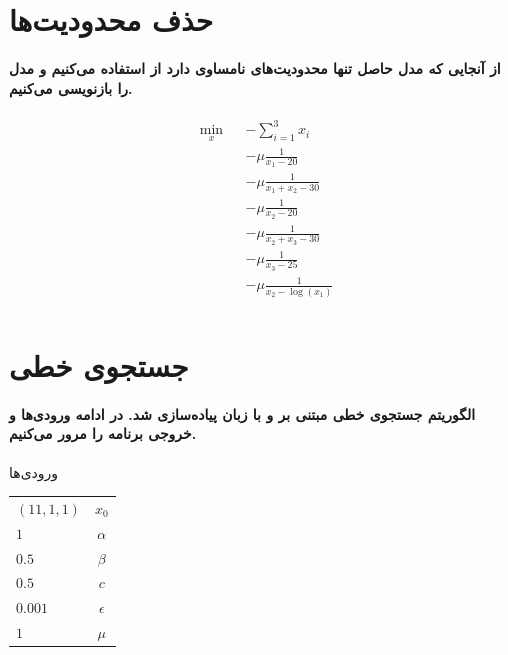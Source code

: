 \documentclass[paper=a4, fontsize=11pt]{article}
\numberwithin{equation}{section} %
\numberwithin{figure}{section} %
\numberwithin{table}{section} %
\begin{document}
\section{حذف محدودیت‌ها}

\paragraph{
    از آنجایی که مدل حاصل تنها محدودیت‌های نامساوی دارد از  استفاده می‌کنیم و مدل را بازنویسی می‌کنیم.
}

\begin{equation}
	\begin{aligned}
		& \underset{x}{\text{min}}
		& & -\sum_{i=1}^{3} x_i \\
		& & & - \mu\frac{1}{x_1 - 20} \\
		& & & - \mu\frac{1}{x_1 + x_2 - 30} \\
		& & & - \mu\frac{1}{x_2 - 20} \\
		& & & - \mu\frac{1}{x_2 + x_3 - 30} \\
		& & & - \mu\frac{1}{x_3 - 25} \\
		& & & - \mu\frac{1}{x_2 - \log(x_1)} \\
	\end{aligned}					
\end{equation}

\section{جستجوی خطی}
\paragraph{
    الگوریتم جستجوی خطی مبتنی بر  و  با زبان 
	پیاده‌سازی شد.
	در ادامه ورودی‌ها و خروجی برنامه را مرور می‌کنیم.
}

\begin{center}
	ورودی‌ها\\
	\begin{tabular}{| l | c |}
		\hline
		$(11, 1, 1)$ & $x_0$ \\
		$1$ & $\alpha$ \\
		$0.5$ & $\beta$ \\
		$0.5$ & $c$ \\
		$0.001$ & $\epsilon$ \\
		$1$ & $\mu$ \\
		\hline
	\end{tabular}
\end{center}
\end{document}
